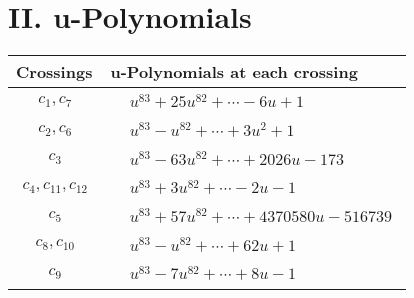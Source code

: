 \documentclass[1p]{elsarticle_modified}
\theoremstyle{definition}
\begin{document}
\newpage\renewcommand{\arraystretch}{1}
\centering \section*{ II. u-Polynomials}
\begin{tabular}{m{50pt}|m{274pt}}
Crossings & \hspace{64pt}u-Polynomials at each crossing \\
\hline $$\begin{aligned}c_{1},c_{7}\end{aligned}$$&$\begin{aligned}
&u^{83}+25 u^{82}+\cdots-6 u+1
\end{aligned}$\\
\hline $$\begin{aligned}c_{2},c_{6}\end{aligned}$$&$\begin{aligned}
&u^{83}- u^{82}+\cdots+3 u^2+1
\end{aligned}$\\
\hline $$\begin{aligned}c_{3}\end{aligned}$$&$\begin{aligned}
&u^{83}-63 u^{82}+\cdots+2026 u-173
\end{aligned}$\\
\hline $$\begin{aligned}c_{4},c_{11},c_{12}\end{aligned}$$&$\begin{aligned}
&u^{83}+3 u^{82}+\cdots-2 u-1
\end{aligned}$\\
\hline $$\begin{aligned}c_{5}\end{aligned}$$&$\begin{aligned}
&u^{83}+57 u^{82}+\cdots+4370580 u-516739
\end{aligned}$\\
\hline $$\begin{aligned}c_{8},c_{10}\end{aligned}$$&$\begin{aligned}
&u^{83}- u^{82}+\cdots+62 u+1
\end{aligned}$\\
\hline $$\begin{aligned}c_{9}\end{aligned}$$&$\begin{aligned}
&u^{83}-7 u^{82}+\cdots+8 u-1
\end{aligned}$\\
\hline
\end{tabular}\newpage\renewcommand{\arraystretch}{1}
\end{document}
